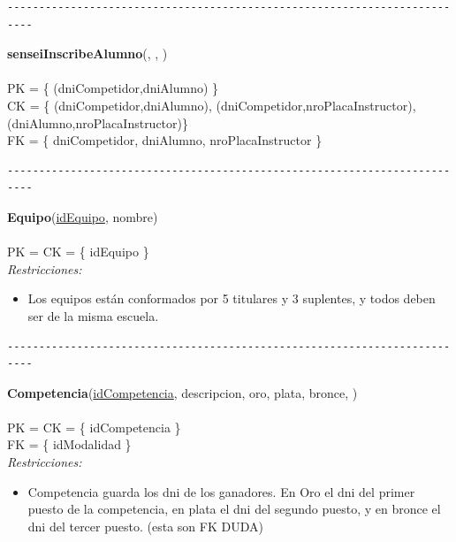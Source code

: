 \begin{verbatim}
--------------------------------------------------------------------------
\end{verbatim}

\noindent\textbf{senseiInscribeAlumno}(, , )
\\
\\
PK = \{ (dniCompetidor,dniAlumno) \} \\
CK = \{ (dniCompetidor,dniAlumno), (dniCompetidor,nroPlacaInstructor), (dniAlumno,nroPlacaInstructor)\} \\
FK = \{ dniCompetidor, dniAlumno, nroPlacaInstructor \} \\


\begin{verbatim}
--------------------------------------------------------------------------
\end{verbatim}

\noindent\textbf{Equipo}(\uline{idEquipo}, nombre)
\\
\\
PK = CK = \{ idEquipo \} \\

\textit{Restricciones:}
\begin{itemize}
	\item Los equipos están conformados por 5 titulares y 3 suplentes, y todos deben ser de la misma escuela.
\end{itemize}


\begin{verbatim}
--------------------------------------------------------------------------
\end{verbatim}

\noindent\textbf{Competencia}(\uline{idCompetencia}, descripcion, oro, plata, bronce, )
\\
\\
PK = CK = \{ idCompetencia \} \\
FK = \{ idModalidad \} \\

\textit{Restricciones:}
\begin{itemize}
	\item Competencia guarda los dni de los ganadores. En Oro el dni del primer puesto de la competencia, en plata el dni del segundo puesto, y en bronce el dni del tercer puesto. (esta son FK DUDA)
\end{itemize}

